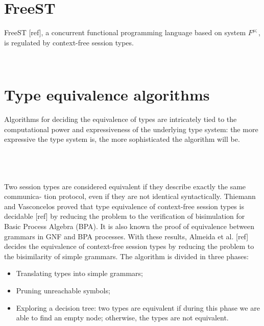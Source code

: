 
\section{FreeST}
FreeST [ref], a concurrent functional programming language based on system $F^{\mu;}$, is regulated by context-free session types.

\\


\section{Type equivalence algorithms}
Algorithms for deciding the equivalence of types are intricately tied to the computational power and expressiveness of the underlying type system: the more expressive the type system is, the more sophisticated the algorithm will be.

\\
\\
\\

Two session types are considered equivalent if they describe exactly the same communica- tion protocol, even if they are not identical syntactically. Thiemann and Vasconcelos proved that type equivalence of context-free session types is decidable [ref] by reducing the problem to the verification of bisimulation for Basic Process Algebra (BPA). It is also known the proof of equivalence between grammars in GNF and BPA processes. With these results,  Almeida et al. [ref] decides the equivalence of context-free session types by reducing the problem to the bisimilarity of simple grammars. The algorithm is divided in three phases:
\begin{itemize}
    \item Translating types into simple grammars;
    \item Pruning unreachable symbols;
    \item Exploring a decision tree: two types are equivalent if during this phase we are able to find an empty node; otherwise,
    the types are not equivalent.
\end{itemize}


